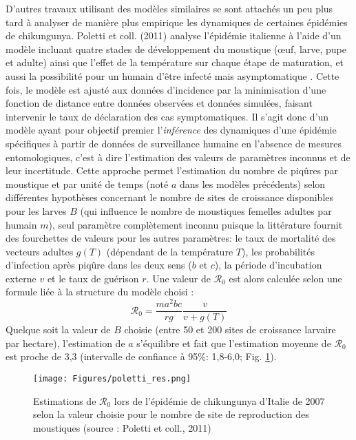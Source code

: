 D'autres travaux utilisant des modèles similaires se sont attachés un peu plus tard à analyser de manière plus empirique les dynamiques de certaines épidémies de chikungunya.
Poletti et coll. (2011) analyse l'épidémie italienne à l'aide d'un modèle incluant quatre stades de développement du moustique (\oe uf, larve, pupe et adulte) ainsi que l'effet de la température sur chaque étape de maturation, et aussi la possibilité pour un humain d'être infecté mais asymptomatique \cite{poletti2011transmission}.
Cette fois, le modèle est ajusté aux données d'incidence par la minimisation d'une fonction de distance entre données observées et données simulées, faisant intervenir le taux de déclaration des cas symptomatiques.
Il s'agit donc d'un modèle ayant pour objectif premier l'{\em inférence} des dynamiques d'une épidémie spécifiques à partir de données de surveillance humaine en l'absence de mesures entomologiques, c'est à dire l'estimation des valeurs de paramètres inconnus et de leur incertitude.
Cette approche permet l'estimation du nombre de piqûres par moustique et par unité de temps (noté $a$ dans les modèles précédents) selon différentes hypothèses concernant le nombre de sites de croissance disponibles pour les larves $B$ (qui influence le nombre de moustiques femelles adultes par humain $m$), seul paramètre complètement inconnu puisque la littérature fournit des fourchettes de valeurs pour les autres paramètres:  le taux de mortalité des vecteurs adultes $g(T)$ (dépendant de la température $T$), les probabilités d'infection après piqûre dans les deux sens ($b$ et $c$), la période d'incubation externe $v$ et le taux de guérison $r$. 
Une valeur de  $\mathcal{R}_0$ est alors calculée selon une formule liée à la structure du modèle choisi :
\begin{equation}
\label{eq:poletti}
\mathcal{R}_0 = \frac{ma^2bc}{rg} \frac{v}{v+g(T)}
\end{equation}
Quelque soit la valeur de $B$ choisie (entre 50 et 200 sites de croissance larvaire par hectare), l'estimation de $a$ s'équilibre et fait que l'estimation moyenne de $\mathcal{R}_0$ est proche de 3,3 (intervalle de confiance à 95\%: 1,8-6,0; Fig. \ref{fig:poletti}).

\begin{figure}[t]
	\centering
	\texttt{[image: Figures/poletti\_res.png]}
	\caption{Estimations de $\mathcal{R}_0$ lors de l'épidémie de chikungunya d'Italie de 2007 selon la valeur choisie pour le nombre de site de reproduction des moustiques (source : Poletti et coll., 2011)}
	\label{fig:poletti}
\end{figure}


